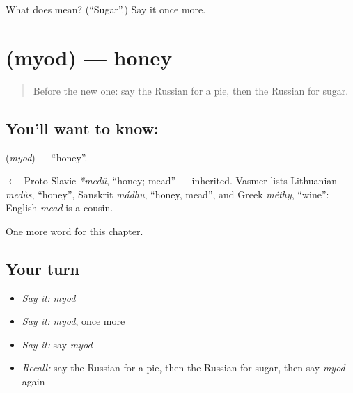 \begin{tcolorbox}[breakable,colback=teal!4,colframe=teal!35!black,title={Before you move on}]
What does  mean? (\textquotedblleft{}Sugar\textquotedblright{}.) Say it once more.
\end{tcolorbox}
\section[\texorpdfstring{\ru{мёд} (myod)}{мёд (myod)}]{ (myod) — honey}

\label{lesson:RU-C47-honey}



\begin{quote}
Before the new one: say the Russian for a pie, then the Russian for sugar.
\end{quote}

\subsection*{You'll want to know: }
\textbf{} (\emph{myod}) — \textquotedblleft{}honey\textquotedblright{}.

\begin{cousinweb}
\textbf{} $\leftarrow$ Proto-Slavic \emph{*medŭ}, \textquotedblleft{}honey; mead\textquotedblright{} — inherited. Vasmer lists Lithuanian \emph{medùs}, \textquotedblleft{}honey\textquotedblright{}, Sanskrit \emph{mádhu}, \textquotedblleft{}honey, mead\textquotedblright{}, and Greek \emph{méthy}, \textquotedblleft{}wine\textquotedblright{}: English \emph{mead} is a cousin.
\end{cousinweb}

\begin{grammarlens}[title={What you've built}]
One more word for this chapter.
\end{grammarlens}

\subsection*{Your turn}
\begin{itemize}
\raggedright
  \item \emph{Say it:} \emph{myod}
  \item \emph{Say it:} \emph{myod}, once more
  \item \emph{Say it:} say \emph{myod}
  \item \emph{Recall:} say the Russian for a pie, then the Russian for sugar, then say \emph{myod} again
\end{itemize}

